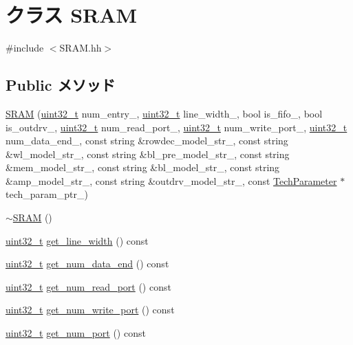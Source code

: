 \hypertarget{classSRAM}{
\section{クラス SRAM}
\label{classSRAM}
}


{\ttfamily \#include $<$SRAM.hh$>$}\subsection*{Public メソッド}
\begin{DoxyCompactItemize}
\item 
\hyperlink{classSRAM_a44e5766c0ab3b73832cb445b67ef48ed}{SRAM} (\hyperlink{Type_8hh_a435d1572bf3f880d55459d9805097f62}{uint32\_\-t} num\_\-entry\_\-, \hyperlink{Type_8hh_a435d1572bf3f880d55459d9805097f62}{uint32\_\-t} line\_\-width\_\-, bool is\_\-fifo\_\-, bool is\_\-outdrv\_\-, \hyperlink{Type_8hh_a435d1572bf3f880d55459d9805097f62}{uint32\_\-t} num\_\-read\_\-port\_\-, \hyperlink{Type_8hh_a435d1572bf3f880d55459d9805097f62}{uint32\_\-t} num\_\-write\_\-port\_\-, \hyperlink{Type_8hh_a435d1572bf3f880d55459d9805097f62}{uint32\_\-t} num\_\-data\_\-end\_\-, const string \&rowdec\_\-model\_\-str\_\-, const string \&wl\_\-model\_\-str\_\-, const string \&bl\_\-pre\_\-model\_\-str\_\-, const string \&mem\_\-model\_\-str\_\-, const string \&bl\_\-model\_\-str\_\-, const string \&amp\_\-model\_\-str\_\-, const string \&outdrv\_\-model\_\-str\_\-, const \hyperlink{classTechParameter}{TechParameter} $\ast$tech\_\-param\_\-ptr\_\-)
\item 
\hyperlink{classSRAM_a28d511ec0a18d1bf56ad56afad48d349}{$\sim$SRAM} ()
\item 
\hyperlink{Type_8hh_a435d1572bf3f880d55459d9805097f62}{uint32\_\-t} \hyperlink{classSRAM_a3331c2b6445f43552b749da69ea9a252}{get\_\-line\_\-width} () const 
\item 
\hyperlink{Type_8hh_a435d1572bf3f880d55459d9805097f62}{uint32\_\-t} \hyperlink{classSRAM_a761fb745955331551770d0d323372db5}{get\_\-num\_\-data\_\-end} () const 
\item 
\hyperlink{Type_8hh_a435d1572bf3f880d55459d9805097f62}{uint32\_\-t} \hyperlink{classSRAM_a1f89e3f79d1f83f22d8e03f7a132242f}{get\_\-num\_\-read\_\-port} () const 
\item 
\hyperlink{Type_8hh_a435d1572bf3f880d55459d9805097f62}{uint32\_\-t} \hyperlink{classSRAM_ae9eea5ec891e765e6bdb63618ba3181a}{get\_\-num\_\-write\_\-port} () const 
\item 
\hyperlink{Type_8hh_a435d1572bf3f880d55459d9805097f62}{uint32\_\-t} \hyperlink{classSRAM_a19419ab4e6838e43d62657758e0821ff}{get\_\-num\_\-port} () const 

\end{DoxyCompactItemize}
